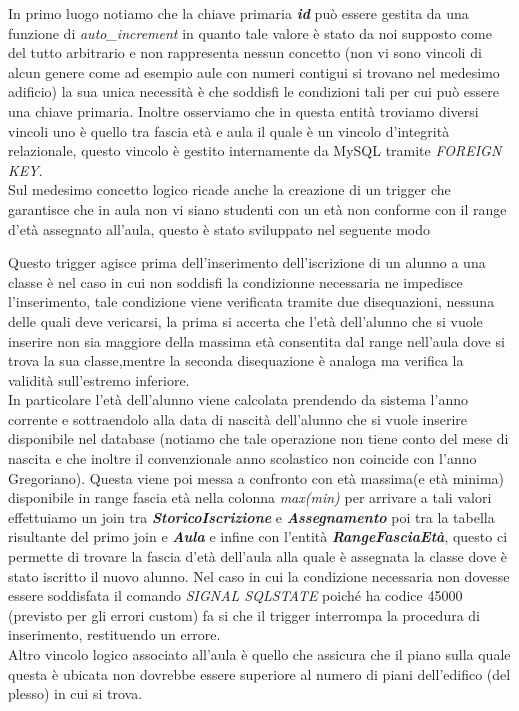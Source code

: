 \documentclass{article}
\begin{document}
\vspace{0.5 cm}

In primo luogo notiamo che la chiave primaria \textit{\textbf{id}} può essere gestita da una funzione di \textit{auto\_increment} in quanto tale valore è stato da noi supposto come del tutto arbitrario e non rappresenta nessun concetto (non vi sono vincoli di alcun genere come ad esempio aule con numeri contigui si trovano nel medesimo adificio) la sua unica necessità è che soddisfi le condizioni tali per cui può essere una chiave primaria.
Inoltre osserviamo che in questa entità troviamo diversi vincoli uno è quello tra fascia età e aula il quale è un vincolo d’integrità relazionale, questo vincolo è gestito internamente da MySQL tramite \textit{FOREIGN KEY}. \\ Sul medesimo concetto logico ricade anche la creazione di un trigger che garantisce che in aula non vi siano studenti con un età non conforme con il range d’età assegnato all’aula, questo è stato sviluppato nel seguente modo

\vspace{0.5 cm}



\vspace{0.5 cm}

Questo trigger agisce prima dell’inserimento dell’iscrizione di un alunno a una classe è nel caso in cui non soddisfi la condizionne necessaria ne impedisce l’inserimento, tale condizione viene verificata tramite due disequazioni, nessuna delle quali deve vericarsi, la prima si accerta che l’età dell’alunno che si vuole inserire non sia maggiore della massima età consentita dal range nell’aula dove si trova la sua classe,mentre la seconda disequazione è analoga ma verifica la validità sull’estremo inferiore. \\
In particolare l’età dell’alunno viene calcolata prendendo da sistema l’anno corrente e sottraendolo alla data di nascità dell’alunno che si vuole inserire disponibile nel database (notiamo che tale operazione non tiene conto del mese di nascita e che inoltre il convenzionale anno scolastico non coincide con l’anno Gregoriano). Questa viene poi messa a confronto con età massima(e età minima) disponibile in range fascia età nella colonna \textit{max(min)} per arrivare a tali valori effettuiamo un join tra \textit{\textbf{StoricoIscrizione}} e \textit{\textbf{Assegnamento}} poi tra la tabella risultante del primo join e \textit{\textbf{Aula}} e infine con l’entità \textit{\textbf{RangeFasciaEtà}}, questo ci permette di trovare la fascia d’età dell’aula alla quale è assegnata la classe dove è stato iscritto il nuovo alunno. Nel caso in cui la condizione necessaria non dovesse essere soddisfata il comando \textit{SIGNAL SQLSTATE} poiché ha codice 45000 (previsto per gli errori custom) fa si che il trigger interrompa la procedura di inserimento, restituendo un errore.\\
Altro vincolo logico associato all'aula è quello che assicura che il piano sulla quale questa è ubicata non dovrebbe essere superiore al numero di piani dell'edifico (del plesso) in cui si trova. 
\end{document}
